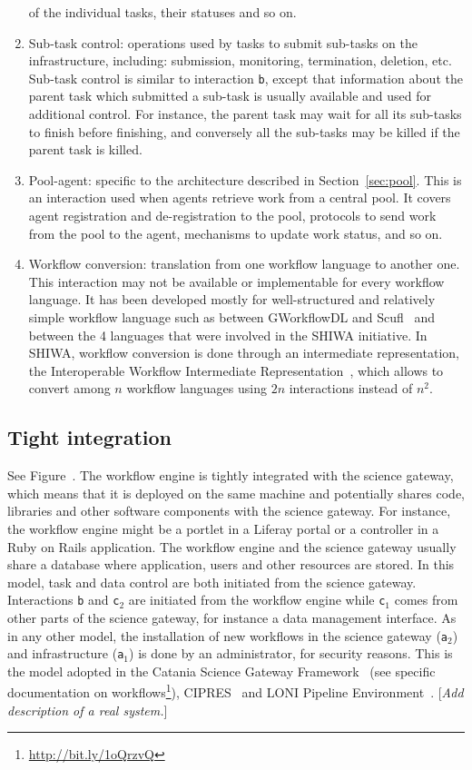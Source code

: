 \documentclass[preprint,3p,twocolumn]{elsarticle}
\newcommand{\todo}[1]{\color{blue}\xspace[\emph{#1}]\xspace\color{black}}
\begin{document}
\begin{enumerate}[leftmargin=0cm,itemindent=0.6cm,label=\texttt{(\alph*)}]
  of the individual tasks, their statuses and so on.
\item Sub-task control: operations used by tasks to submit sub-tasks
  on the infrastructure, including: submission, monitoring,
  termination, deletion, etc. Sub-task control is similar to
  interaction \texttt{b}, except that information about the parent
  task which submitted a sub-task is usually available and used for
  additional control. For instance, the parent task may wait for all
  its sub-tasks to finish before finishing, and conversely all the
  sub-tasks may be killed if the parent task is killed.
\item Pool-agent: specific to the architecture described
  in Section~\ref{sec:pool}. This is an interaction used when agents retrieve
  work from a central pool. It covers agent registration and
  de-registration to the pool, protocols to send work from the pool to
  the agent, mechanisms to update work status, and so on. 
\item Workflow conversion: translation from one workflow language to
  another one. This interaction may not be available or implementable
  for every workflow language. It has been developed mostly for
  well-structured and relatively simple workflow language such as between GWorkflowDL
  and Scufl~\cite{OLAB-09} and between the 4 languages that were involved in the
  SHIWA initiative. In SHIWA, workflow conversion is done through an
  intermediate representation, the Interoperable Workflow Intermediate
  Representation~\cite{plankensteiner-montagnat-etal:2011}, which
  allows to convert among $n$ workflow languages using $2n$
  interactions instead of $n^2$.
\end{enumerate}


\subsection{Tight integration}

See Figure~. The workflow engine is tightly
integrated with the science gateway, which means that it is deployed
on the same machine and potentially shares code, libraries and other
software components with the science gateway. For instance, the
workflow engine might be a portlet in a Liferay portal or a controller
in a Ruby on Rails application. The workflow engine and the science
gateway usually share a database where application, users and other
resources are stored. In this model, task and data control are both
initiated from the science gateway. Interactions \texttt{b} and
\texttt{c$_2$} are initiated from the workflow engine while
\texttt{c$_1$} comes from other parts of the science gateway, for
instance a data management interface. As in any other model, the
installation of new workflows in the science gateway (\texttt{a$_2$})
and infrastructure (\texttt{a$_1$}) is done by an administrator, for
security reasons. This is the model adopted in the Catania Science
Gateway Framework~\cite{Ardizzone2012} (see specific documentation on
workflows\footnote{\url{http://bit.ly/1oQrzvQ}}),
CIPRES~\cite{miller2010creating} and LONI Pipeline
Environment~\cite{dinov2009efficient}.
\todo{Add description of a real system.}
\end{document}
